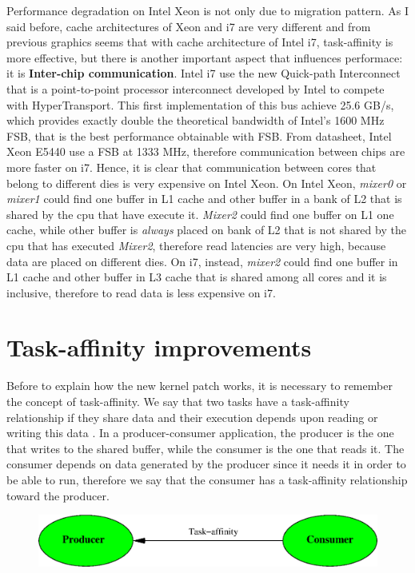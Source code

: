 Performance degradation on Intel Xeon is not only due to migration pattern. As I said before, cache architectures of Xeon and i7 are very different and
from previous graphics seems that with cache architecture of Intel i7, task-affinity is more effective, but there is another important aspect that 
influences performace: it is \textbf{Inter-chip communication}. Intel i7 use the new Quick-path Interconnect that is a point-to-point processor 
interconnect developed by Intel to compete with HyperTransport. This first implementation of this bus achieve 25.6 GB/s, which provides exactly double the 
theoretical bandwidth of Intel's 1600 MHz FSB, that is the best performance obtainable with FSB. From datasheet, Intel Xeon E5440 use a FSB at 1333 MHz, 
therefore communication between chips are more faster on i7. Hence, it is clear that communication between cores that belong to different dies is very 
expensive on Intel Xeon. On Intel Xeon, \textit{mixer0} or \textit{mixer1} could find one buffer in L1 cache and other buffer in a bank of L2 that is 
shared by the cpu that have execute it. \textit{Mixer2} could find one buffer on L1 one cache, while other buffer is \textit{always} placed on bank of L2 
that is not shared by the cpu that has executed \textit{Mixer2}, therefore read latencies are very high, because data are placed on different dies. 
On i7, instead, \textit{mixer2} could find one buffer in L1 cache and other buffer in L3 cache that is shared among all cores and it is inclusive, 
therefore to read data is less expensive on i7.

\section{Task-affinity improvements}

Before to explain how the new kernel patch works, it is necessary to remember the concept of task-affinity. We say that two tasks have a task-affinity 
relationship if they share data and their execution depends upon reading or writing this data \cite{lcs}. In a producer-consumer application, the 
producer is the one that writes to the shared buffer, while the consumer is the one that reads it. The consumer depends on data generated by the producer 
since it needs it in order to be able to run, therefore we say that the consumer has a task-affinity relationship toward the producer.

\begin{figure}[htbp]
\centering
\includegraphics[width=\widefigure]{images/taskaff-rel.eps}
\caption{}
\label{fig:taskaff-rel}
\end{figure}

